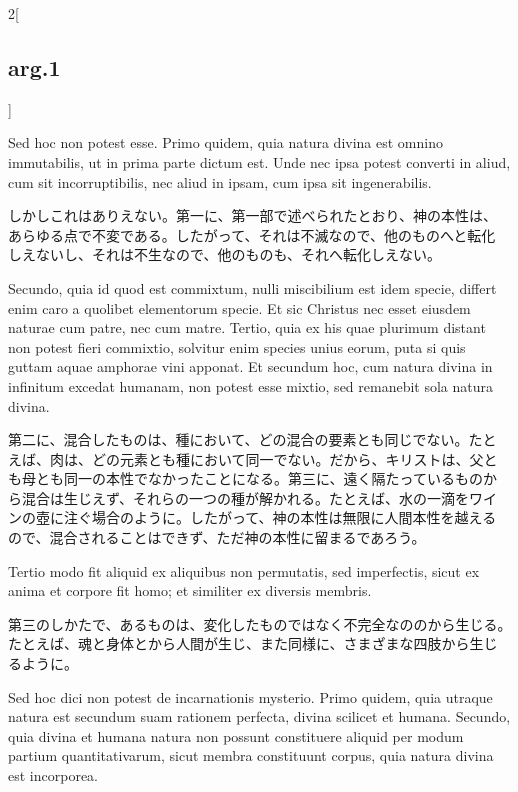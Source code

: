 \documentclass[paper=a4paper,fontsize=10pt,jafontsize=9pt,titlepage]{jlreq}
\begin{document}
\begin{paracol}{2}[\subsection{arg.1}]
\switchcolumn*

Sed hoc non potest esse. Primo quidem, quia natura divina est omnino
immutabilis, ut in prima parte dictum est. Unde nec ipsa potest
converti in aliud, cum sit incorruptibilis, nec aliud in ipsam, cum
ipsa sit ingenerabilis.

\switchcolumn

しかしこれはありえない。第一に、第一部で述べられたとおり、神の本性は、
あらゆる点で不変である。したがって、それは不滅なので、他のものへと転化
しえないし、それは不生なので、他のものも、それへ転化しえない。

\switchcolumn*

Secundo, quia id quod est commixtum, nulli miscibilium est idem
specie, differt enim caro a quolibet elementorum specie. Et sic
Christus nec esset eiusdem naturae cum patre, nec cum matre. Tertio,
quia ex his quae plurimum distant non potest fieri commixtio, solvitur
enim species unius eorum, puta si quis guttam aquae amphorae vini
apponat. Et secundum hoc, cum natura divina in infinitum excedat
humanam, non potest esse mixtio, sed remanebit sola natura divina.

\switchcolumn

第二に、混合したものは、種において、どの混合の要素とも同じでない。たと
えば、肉は、どの元素とも種において同一でない。だから、キリストは、父と
も母とも同一の本性でなかったことになる。第三に、遠く隔たっているものか
ら混合は生じえず、それらの一つの種が解かれる。たとえば、水の一滴をワイ
ンの壺に注ぐ場合のように。したがって、神の本性は無限に人間本性を越える
ので、混合されることはできず、ただ神の本性に留まるであろう。

\switchcolumn*

Tertio modo fit aliquid ex aliquibus non permutatis, sed imperfectis,
sicut ex anima et corpore fit homo; et similiter ex diversis membris.

\switchcolumn

第三のしかたで、あるものは、変化したものではなく不完全なののから生じる。
たとえば、魂と身体とから人間が生じ、また同様に、さまざまな四肢から生じ
るように。

\switchcolumn*

Sed hoc dici non potest de incarnationis mysterio. Primo quidem, quia
utraque natura est secundum suam rationem perfecta, divina scilicet et
humana. Secundo, quia divina et humana natura non possunt constituere
aliquid per modum partium quantitativarum, sicut membra constituunt
corpus, quia natura divina est incorporea.


\end{paracol}
\end{document}
